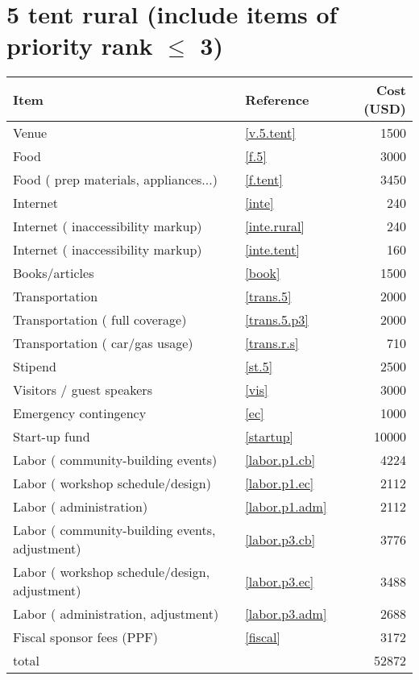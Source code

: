\section*{5 tent rural (include items of priority rank $\leq$ 3)}
\begin{center}
\begin{tabular}{llr}
Item & Reference & Cost (USD) \\ \hline
Venue & \ref{v.5.tent} & 1500 \\
Food & \ref{f.5} & 3000 \\
Food ( prep materials, appliances...) & \ref{f.tent} & 3450 \\
Internet & \ref{inte} & 240 \\
Internet ( inaccessibility markup) & \ref{inte.rural} & 240 \\
Internet ( inaccessibility markup) & \ref{inte.tent} & 160 \\
Books/articles & \ref{book} & 1500 \\
Transportation & \ref{trans.5} & 2000 \\
Transportation ( full coverage) & \ref{trans.5.p3} & 2000 \\
Transportation ( car/gas usage) & \ref{trans.r.s} & 710 \\
Stipend & \ref{st.5} & 2500 \\
Visitors / guest speakers & \ref{vis} & 3000 \\
Emergency contingency & \ref{ec} & 1000 \\
Start-up fund & \ref{startup} & 10000 \\
Labor ( community-building events) & \ref{labor.p1.cb} & 4224 \\
Labor ( workshop schedule/design) & \ref{labor.p1.ec} & 2112 \\
Labor ( administration) & \ref{labor.p1.adm} & 2112 \\
Labor ( community-building events, adjustment) & \ref{labor.p3.cb} & 3776 \\
Labor ( workshop schedule/design, adjustment) & \ref{labor.p3.ec} & 3488 \\
Labor ( administration, adjustment) & \ref{labor.p3.adm} & 2688 \\
Fiscal sponsor fees (PPF) & \ref{fiscal} & 3172 \\ \hline
total &  & 52872
\end{tabular}
\end{center}
\newpage
